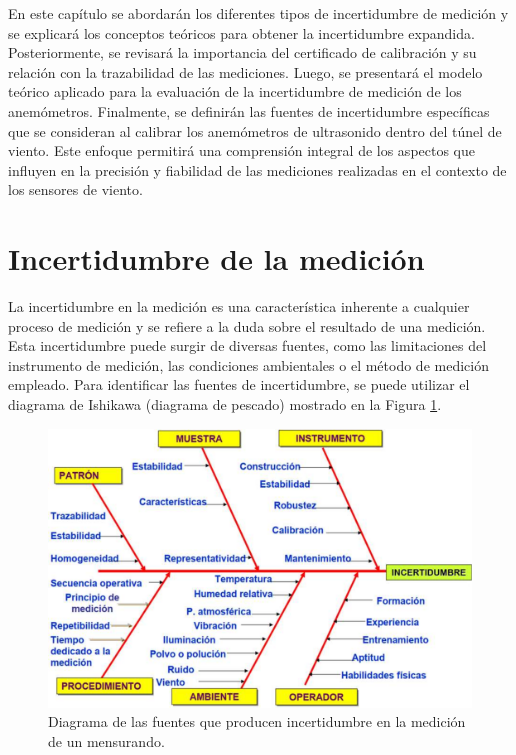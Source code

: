 En este capítulo se abordarán los diferentes tipos de incertidumbre de medición y se explicará los conceptos teóricos para obtener la incertidumbre expandida. Posteriormente, se revisará la importancia del certificado de calibración y su relación con la trazabilidad de las mediciones. Luego, se presentará el modelo teórico aplicado para la evaluación de la incertidumbre de medición de los anemómetros. Finalmente, se definirán las fuentes de incertidumbre específicas que se consideran al calibrar los anemómetros de ultrasonido dentro del túnel de viento.  Este enfoque permitirá una comprensión integral de los aspectos que influyen en la precisión y fiabilidad de las mediciones realizadas en el contexto de los sensores de viento.

\section{Incertidumbre de la medición}\label{sec:tipos_incertidumbre}

La incertidumbre en la medición es una característica inherente a cualquier proceso de medición y se refiere a la duda sobre el resultado de una medición. Esta incertidumbre puede surgir de diversas fuentes, como las limitaciones del instrumento de medición, las condiciones ambientales o el método de medición empleado. Para identificar las fuentes de incertidumbre, se puede utilizar el diagrama de Ishikawa (diagrama de pescado) mostrado en la Figura \ref{fig:diagramaPescado}.

\begin{figure}[H]
    \centering
    \includegraphics[width=0.8\linewidth]{Figuras/calculoIncertidumbre/diagramaPescado.png}
    \caption{Diagrama de las fuentes que producen incertidumbre en la medición de un mensurando. \cite{instrumentosMedicionesFiuba}}
    \label{fig:diagramaPescado}
\end{figure}

